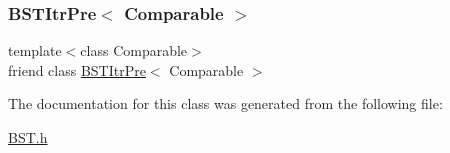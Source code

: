 \subsubsection{\texorpdfstring{B\+S\+T\+Itr\+Pre$<$ Comparable $>$}{BSTItrPre< Comparable >}}
{\footnotesize\ttfamily template$<$class Comparable$>$ \\
friend class \hyperlink{class_b_s_t_itr_pre}{B\+S\+T\+Itr\+Pre}$<$ Comparable $>$\hspace{0.3cm}{\ttfamily [friend]}}



The documentation for this class was generated from the following file\+:\begin{DoxyCompactItemize}
\item 
\hyperlink{_b_s_t_8h}{B\+S\+T.\+h}\end{DoxyCompactItemize}
